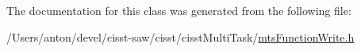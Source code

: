 The documentation for this class was generated from the following file\+:\begin{DoxyCompactItemize}
\item 
/\+Users/anton/devel/cisst-\/saw/cisst/cisst\+Multi\+Task/\hyperlink{mts_function_write_8h}{mts\+Function\+Write.\+h}\end{DoxyCompactItemize}
